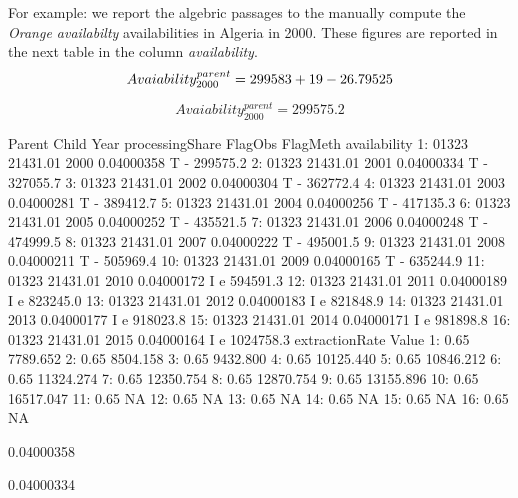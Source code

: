 \documentclass[nojss]{jss}
\begin{document}
\begin{enumerate}
{            For example: we report the algebric passages to the manually compute the \textit{Orange availabilty} availabilities in Algeria in 2000. These figures are reported in the next table in the column \textit{availability}.
             \begin{dmath*}
             Avaiability_{2000}^{parent}=299583    +  19 - 26.79525  \\
             \end{dmath*}
             
             \begin{dmath*}
             Avaiability_{2000}^{parent}=299575.2
             \end{dmath*}
             }
  
    
\begin{Schunk}
\begin{Soutput}
    Parent    Child Year processingShare FlagObs FlagMeth availability
 1:  01323 21431.01 2000      0.04000358       T        -     299575.2
 2:  01323 21431.01 2001      0.04000334       T        -     327055.7
 3:  01323 21431.01 2002      0.04000304       T        -     362772.4
 4:  01323 21431.01 2003      0.04000281       T        -     389412.7
 5:  01323 21431.01 2004      0.04000256       T        -     417135.3
 6:  01323 21431.01 2005      0.04000252       T        -     435521.5
 7:  01323 21431.01 2006      0.04000248       T        -     474999.5
 8:  01323 21431.01 2007      0.04000222       T        -     495001.5
 9:  01323 21431.01 2008      0.04000211       T        -     505969.4
10:  01323 21431.01 2009      0.04000165       T        -     635244.9
11:  01323 21431.01 2010      0.04000172       I        e     594591.3
12:  01323 21431.01 2011      0.04000189       I        e     823245.0
13:  01323 21431.01 2012      0.04000183       I        e     821848.9
14:  01323 21431.01 2013      0.04000177       I        e     918023.8
15:  01323 21431.01 2014      0.04000171       I        e     981898.8
16:  01323 21431.01 2015      0.04000164       I        e    1024758.3
    extractionRate     Value
 1:           0.65  7789.652
 2:           0.65  8504.158
 3:           0.65  9432.800
 4:           0.65 10125.440
 5:           0.65 10846.212
 6:           0.65 11324.274
 7:           0.65 12350.754
 8:           0.65 12870.754
 9:           0.65 13155.896
10:           0.65 16517.047
11:           0.65        NA
12:           0.65        NA
13:           0.65        NA
14:           0.65        NA
15:           0.65        NA
16:           0.65        NA
\end{Soutput}
\begin{Soutput}
[1] 0.04000358
\end{Soutput}
\begin{Soutput}
[1] 0.04000334
\end{Soutput}
\end{Schunk}
  

\end{enumerate}
\end{document}
